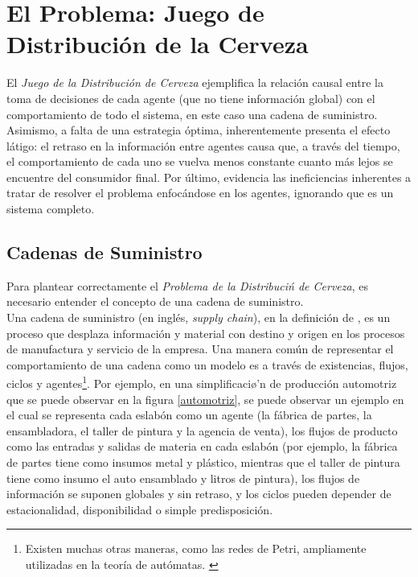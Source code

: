 \chapter{El Problema: Juego de Distribuci\'on de la Cerveza}

El \textit{Juego de la Distribución de Cerveza} ejemplifica la relaci\'on causal entre la toma de decisiones de cada agente (que no tiene informaci\'on global) con el comportamiento de todo el sistema, en este caso una cadena de suministro. Asimismo, a falta de una estrategia \'optima, inherentemente presenta el efecto l\'atigo: el retraso en la informaci\'on entre agentes causa que, a trav\'es del tiempo, el comportamiento de cada uno se vuelva menos constante cuanto m\'as lejos se encuentre del consumidor final. Por \'ultimo, evidencia las ineficiencias inherentes a tratar de resolver el problema enfoc\'andose en los agentes, ignorando que es un sistema completo. 




\section{Cadenas de Suministro}

Para plantear correctamente el \textit{Problema de la Distribuci\'n de Cerveza}, es necesario entender el concepto de una cadena de suministro. \\

Una cadena de suministro (en ingl\'es, \textit{supply chain}), en la definici\'on de \citet{Jacobs},  es un proceso que desplaza informaci\'on y material con destino y origen en los procesos de manufactura y servicio de la empresa. Una manera com\'un de representar el comportamiento de una cadena como un modelo es a trav\'es de existencias, flujos, ciclos y agentes\footnote{Existen muchas otras maneras, como las redes de Petri, ampliamente utilizadas en la teor\'ia de aut\'omatas. \citet{Shiflet}}. Por ejemplo, en una simplificaci\o'n de producci\'on automotriz que se puede observar en la figura \ref{automotriz}, se puede observar un ejemplo en el cual se representa cada eslab\'on como un agente (la f\'abrica de partes, la ensambladora, el taller de pintura y la agencia de venta), los flujos de producto como las entradas y salidas de materia en cada eslab\'on (por ejemplo, la f\'abrica de partes tiene como insumos metal y pl\'astico, mientras que el taller de pintura tiene como insumo el auto ensamblado y litros de pintura), los flujos de informaci\'on se suponen globales y sin retraso, y los ciclos pueden depender de estacionalidad, disponibilidad o simple predisposici\'on.\\

